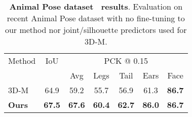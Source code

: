 
\begin{table}
    \begin{tabular}{@{}lcccccc@{}}
    \toprule
    \multicolumn{1}{l}{Method} & 
    \multicolumn{1}{c}{IoU} & 
    \multicolumn{5}{c}{PCK @ 0.15} \\
    \multicolumn{2}{c}{} &
    \multicolumn{1}{c}{Avg} &
    \multicolumn{1}{c}{Legs} &
    \multicolumn{1}{c}{Tail} &
    \multicolumn{1}{c}{Ears} &
    \multicolumn{1}{c}{Face} \\
    \midrule
    3D-M~\cite{zuffi2017menagerie} & 64.9 & 59.2 & 55.7 & 56.9 & 61.3 & \textbf{86.7} \\
    \textbf{Ours} & \textbf{67.5} & \textbf{67.6} & \textbf{60.4} & \textbf{62.7} & \textbf{86.0} & \textbf{86.7} \\
    \bottomrule
    \end{tabular}
    \caption[]{
        \label{tab:animalposefix}
        \textbf{Animal Pose dataset~\cite{animalpose} results}. Evaluation on recent Animal Pose dataset with no fine-tuning to our method nor joint/silhouette predictors used for 3D-M.
    }
\end{table}
